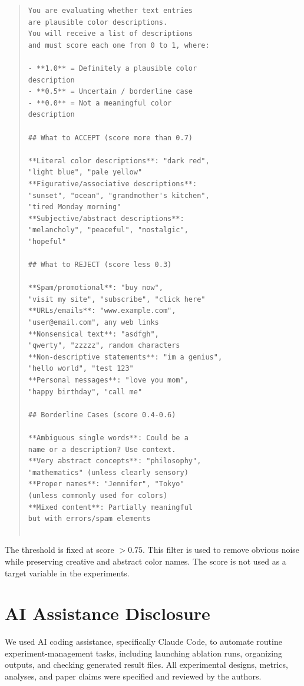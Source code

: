 \documentclass[11pt]{article}
\begin{document}
\begin{quote}
\small
\begin{verbatim}
You are evaluating whether text entries 
are plausible color descriptions. 
You will receive a list of descriptions 
and must score each one from 0 to 1, where:

- **1.0** = Definitely a plausible color 
description
- **0.5** = Uncertain / borderline case
- **0.0** = Not a meaningful color 
description

## What to ACCEPT (score more than 0.7)

**Literal color descriptions**: "dark red", 
"light blue", "pale yellow"
**Figurative/associative descriptions**: 
"sunset", "ocean", "grandmother's kitchen", 
"tired Monday morning"
**Subjective/abstract descriptions**: 
"melancholy", "peaceful", "nostalgic", 
"hopeful"

## What to REJECT (score less 0.3)

**Spam/promotional**: "buy now", 
"visit my site", "subscribe", "click here"
**URLs/emails**: "www.example.com", 
"user@email.com", any web links
**Nonsensical text**: "asdfgh",
"qwerty", "zzzzz", random characters
**Non-descriptive statements**: "im a genius", 
"hello world", "test 123"
**Personal messages**: "love you mom",
"happy birthday", "call me"

## Borderline Cases (score 0.4-0.6)

**Ambiguous single words**: Could be a 
name or a description? Use context.
**Very abstract concepts**: "philosophy", 
"mathematics" (unless clearly sensory)
**Proper names**: "Jennifer", "Tokyo" 
(unless commonly used for colors)
**Mixed content**: Partially meaningful 
but with errors/spam elements


\end{verbatim}
\end{quote}



The threshold is fixed at score $>0.75$. This filter is used
to remove obvious noise while preserving creative and abstract color names.
The score is not used as a target variable in the experiments.








\section{AI Assistance Disclosure}
\label{app:ai_assistance}

We used AI coding assistance, specifically Claude Code, to automate routine
experiment-management tasks, including launching ablation runs, organizing
outputs, and checking generated result files. All experimental designs,
metrics, analyses, and paper claims were specified and reviewed by the
authors.
\end{document}
